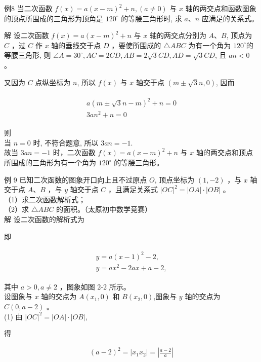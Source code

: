 \documentclass[10pt]{article}
\begin{document}
例8 当二次函数 $f(x)=a(x-m)^{2}+n,(a \neq 0)$ 与 $x$ 轴的两交点和函数图象的顶点所围成的三角形为顶角是 $120^{\circ}$ 的等腰三角形时, 求 $a 、 n$ 应满足的关系式。

解 设二次函数 $f(x)=a(x-m)^{2}+n$ 与 $x$ 轴的两交点分别为 $A 、 B$, 顶点为 $C$ ，过 $C$ 作 $x$ 轴的垂线交于点 $D$ ，要使所围成的 $\triangle A B C$ 为有一个角为 $120^{\circ}$的等腰三角形, 则 $\angle A=30^{\circ}, A C=2 C D, A B=2 \sqrt{3} C D, A D=\sqrt{3} C D$, 且 $a n<0$ 。

又因为 $C$ 点纵坐标为 $n$, 所以 $f(x)$ 与 $x$ 轴交于点 $(m \pm \sqrt{3} n, 0)$, 因而

\begin{align*}
\begin{gathered}
a(m \pm \sqrt{3} n-m)^{2}+n=0 \\
3 a n^{2}+n=0
\end{gathered}
\end{align*}

则\\
当 $n=0$ 时, 不符合题意, 所以 $3 a n=-1$.\\
故当 $3 a n=-1$ 时，二次函数 $f(x)=a(x-m)^{2}+n$ 与 $x$ 轴的两交点和顶点所围成的三角形为有一个角为 $120^{\circ}$ 的等腰三角形。

例 9 已知二次函数的图象开口向上且不过原点 $O$, 顶点坐标为 $(1,-2)$ ，与 $x$ 轴交于点 $A 、 B$ ，与 $y$ 轴交于点 $C$ ，且满足关系式 $|O C|^{2}=|O A| \cdot|O B|$ 。\\
（1）求二次函数解析式；\\
（2）求 $\triangle A B C$ 的面积。（太原初中数学竞赛）\\
解 设二次函数的解析式为

即

\begin{align*}
\begin{gathered}
y=a(x-1)^{2}-2, \\
y=a x^{2}-2 a x+a-2,
\end{gathered}
\end{align*}

其中 $a>0, a \neq 2$ ，图象如图 2-2 所示。\\
设图象与 $x$ 轴的交点为 $A\left(x_{1}, 0\right)$ 和 $B\left(x_{2}, 0\right)$,图象与 $y$ 轴的交点为 $C(0, a-2)$ 。\\
(1) 由 $|O C|^{2}=|O A| \cdot|O B|$,

得

\begin{align*}
(a-2)^{2}=\left|x_{1} x_{2}\right|=\left|\frac{a-2}{a}\right|
\end{align*}
\end{document}
